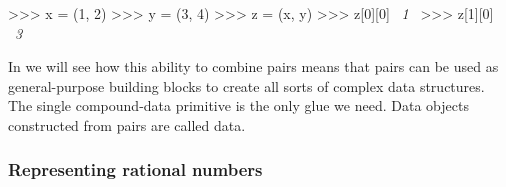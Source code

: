\begin{codeBlock}
>>> x = (1, 2)
>>> y = (3, 4)
>>> z = (x, y)
>>> z[0][0]
~\textit{1}~
>>> z[1][0]
~\textit{3}~
\end{codeBlock}

\noindent
In  we will see how this ability to combine pairs means that
pairs can be used as general-purpose building blocks to create all sorts of
complex data structures.  The single compound-data primitive  is
the only glue we need.  Data objects constructed from pairs are called
 data.

\subsubsection*{Representing rational numbers}

